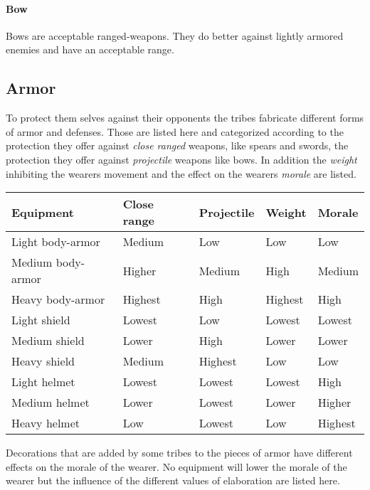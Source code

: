 \paragraph{Bow}

Bows are acceptable ranged-weapons. They do better against lightly armored
enemies and have an acceptable range.

\subsection{\Gls*{Armor}}\label{ch:Goods:Armory:Armor}

To protect them selves against their opponents the tribes fabricate different
forms of armor and defenses. Those are listed here and categorized according to
the protection they offer against \emph{close ranged} weapons, like spears and
swords, the protection they offer against \emph{projectile} weapons like bows.
In addition the \emph{weight} inhibiting the wearers movement and the effect on
the wearers \emph{morale} are listed.

\begin{longtable}{lllll}
	\toprule
	Equipment
	 & Close range & Projectile & Weight  & Morale  \\
	\midrule
	Light body-armor
	 & Medium      & Low        & Low     & Low     \\
	Medium body-armor
	 & Higher      & Medium     & High    & Medium  \\
	Heavy body-armor
	 & Highest     & High       & Highest & High    \\
	\midrule
	Light shield
	 & Lowest      & Low        & Lowest  & Lowest  \\
	Medium shield
	 & Lower       & High       & Lower   & Lower   \\
	Heavy shield
	 & Medium      & Highest    & Low     & Low     \\
	\midrule
	Light helmet
	 & Lowest      & Lowest     & Lowest  & High    \\
	Medium helmet
	 & Lower       & Lowest     & Lower   & Higher  \\
	Heavy helmet
	 & Low         & Lowest     & Low     & Highest \\
	\bottomrule
\end{longtable}

Decorations that are added by some tribes to the pieces of armor have different
effects on the morale of the wearer. No equipment will lower the morale of the
wearer but the influence of the different values of elaboration are listed
here.

